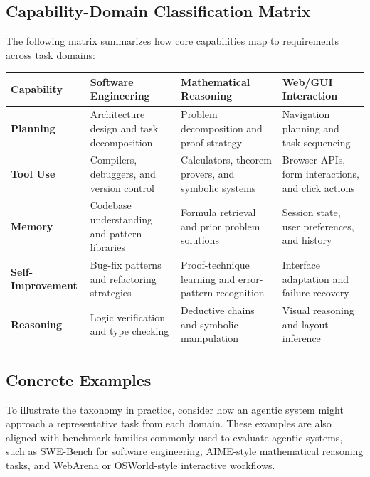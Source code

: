 \subsection{Capability-Domain Classification Matrix}

The following matrix summarizes how core capabilities map to requirements across task domains:

\begin{table}[tbp]
\centering
\footnotesize
\begin{tabularx}{\textwidth}{YYYY}
\toprule
\textbf{Capability} & \textbf{Software Engineering} & \textbf{Mathematical Reasoning} & \textbf{Web/GUI Interaction} \\
\midrule
\textbf{Planning} & Architecture design and task decomposition & Problem decomposition and proof strategy & Navigation planning and task sequencing \\
\textbf{Tool Use} & Compilers, debuggers, and version control & Calculators, theorem provers, and symbolic systems & Browser APIs, form interactions, and click actions \\
\textbf{Memory} & Codebase understanding and pattern libraries & Formula retrieval and prior problem solutions & Session state, user preferences, and history \\
\textbf{Self-Improvement} & Bug-fix patterns and refactoring strategies & Proof-technique learning and error-pattern recognition & Interface adaptation and failure recovery \\
\textbf{Reasoning} & Logic verification and type checking & Deductive chains and symbolic manipulation & Visual reasoning and layout inference \\
\bottomrule
\end{tabularx}
\end{table}

\subsection{Concrete Examples}

To illustrate the taxonomy in practice, consider how an agentic system might approach a representative task from each domain. These examples are also aligned with benchmark families commonly used to evaluate agentic systems, such as SWE-Bench for software engineering, AIME-style mathematical reasoning tasks, and WebArena or OSWorld-style interactive workflows.

